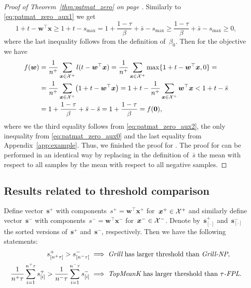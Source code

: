\begin{proof}[Proof of Theorem~\ref{thm:patmat_zero} on page \pageref{thm:patmat_zero}]
  Similarly to \eqref{eq:patmat_zero_aux1} we get
  \begin{equation}\label{eq:patmat_zero_aux2}
    1 + t - \bm{w}^\top \bm{x}
    \ge 1 + t-s_{\max}
    =   1 + \frac{1-\tau}{\beta} + \bar{s} - s_{\max}
    \ge \frac{1-\tau}{\beta} + \bar{s} - s_{\max}
    \ge 0,
  \end{equation}
  where the last inequality follows from the definition of~$\beta_0$. Then for the objective we have
  \begin{equation*}
    \begin{aligned}
      f(\bm{w})
      & = \frac{1}{n^+}\sum_{\bm{x} \in \Xc^+}l(t-\bm{w}^\top \bm{x})
        = \frac{1}{n^+}\sum_{\bm{x} \in \Xc^+}\max\{1+t-\bm{w}^\top \bm{x}, 0\} = \\
      & = \frac{1}{n^+}\sum_{\bm{x} \in \Xc^+}\Brac{1+t-\bm{w}^\top \bm{x}}
        = 1 + t - \frac{1}{n^+}\sum_{\bm{x} \in \Xc^+}\bm{w}^\top \bm{x}
        < 1 + t - \bar{s} \\
      & = 1 + \frac{1-\tau}{\beta} + \bar{s} -\bar{s}
        = 1 + \frac{1-\tau}{\beta}
        = f(\bm{0}),\\
    \end{aligned}
  \end{equation*}
  where we the third equality follows from \eqref{eq:patmat_zero_aux2}, the only inequality from \eqref{eq:patmat_zero_aux0} and the last equality from Appendix~\ref{app:example}. Thus, we finished the proof for \PatMat. The proof for \PatMatNP can be performed in an identical way by replacing in the definition of~$\bar{s}$ the mean with respect to all samples by the mean with respect to all negative samples.
\end{proof}

\subsection{Results related to threshold comparison}\label{app:relations}

\begin{lemma}\label{lemma:thresholds2}
  Define vector~$\bm{s}^+$ with components~$s^+=\bm{w}^\top \bm{x}^+$ for~$\bm{x}^+\in\mathcal{X}^+$ and similarly define vector~$\bm{s}^-$ with components~$s^-=\bm{w}^\top \bm{x}^-$ for~$\bm{x}^-\in\mathcal{X}^-$. Denote by~$\bm{s}_{[\cdot]}^+$ and~$\bm{s}_{[\cdot]}^-$ the sorted versions of~$\bm{s}^+$ and~$\bm{s}^-$, respectively. Then we have the following statements:
  \begin{equation*}
    \begin{aligned}
      s_{[n^+\tau]}^+ > s_{[n^-\tau]}^-
      & \implies \emph{Grill} \text{ has larger threshold than }\emph{Grill-NP}, \\
      \frac{1}{n^+\tau}\sum_{i=1}^{n^+\tau} s_{[i]}^+
      > \frac{1}{n^-\tau}\sum_{i=1}^{n^-\tau} s_{[i]}^-
      & \implies \emph{TopMeanK} \text{ has larger threshold than }{\emph{$\tau$-FPL}}. \\
    \end{aligned}
  \end{equation*}
\end{lemma}

